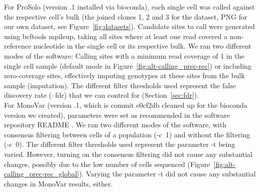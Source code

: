 \documentclass[authoryear,preprint,11pt]{scrartcl}
\begin{document}
For ProSolo (version {.1} installed via bioconda), each single cell was called against the respective cell's bulk (the joined clones 1, 2 and 3 for the \citep{dong_accurate_2017} dataset, PNG for our own dataset, see Figure~\ref{fig:datasets}).
Candidate sites to call were generated using bcftools mpileup, taking all sites where at least one read covered a non-reference nucleotide in the single cell or its respective bulk.
We ran two different modes of the software: Calling sites with a minimum read coverage of 1 in the single cell sample (default mode in Figure~\ref{fig:alt-calling_prec-rec}) or including zero-coverage sites, effectively imputing genotypes at these sites from the bulk sample (imputation).
The different filter thresholds used represent the false discovery rate ({\ttfamily --fdr}) that we can control for (Section~\ref{sec:fdr}).\\

For MonoVar (version {.1}, which is commit {\ttfamily e0cf2db} cleaned up for the bioconda version we created), parameters were set as recommended in the software repository README \citep{zafar_monovar_nodate}.
We ran two different modes of the software, with consensus filtering between cells of a population ({\ttfamily -c~1}) and without the filtering ({\ttfamily -c~0}).
The different filter thresholds used represent the parameter {\ttfamily -t} being varied.
However, turning on the consensus filtering did not cause any substantial changes, possibly due to the low number of cells sequenced (Figure~\ref{fig:alt-calling_prec-rec_global}).
Varying the parameter {\ttfamily -t} did not cause any substantial changes in MonoVar results, either.\\
\end{document}
